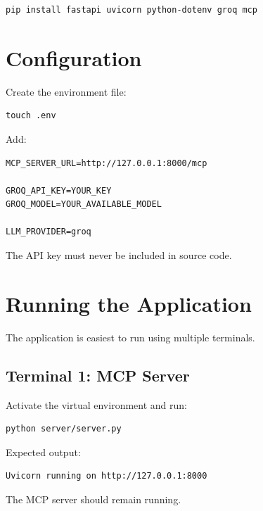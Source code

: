 \documentclass[11pt,a4paper]{article}
\begin{document}
\begin{lstlisting}[style=terminal]
pip install fastapi uvicorn python-dotenv groq mcp
\end{lstlisting}

\section{Configuration}

Create the environment file:

\begin{lstlisting}[style=terminal]
touch .env
\end{lstlisting}

Add:

\begin{lstlisting}[style=env]
MCP_SERVER_URL=http://127.0.0.1:8000/mcp

GROQ_API_KEY=YOUR_KEY
GROQ_MODEL=YOUR_AVAILABLE_MODEL

LLM_PROVIDER=groq
\end{lstlisting}

The API key must never be included in source code.

\section{Running the Application}

The application is easiest to run using multiple terminals.

\subsection{Terminal 1: MCP Server}

Activate the virtual environment and run:

\begin{lstlisting}[style=terminal]
python server/server.py
\end{lstlisting}

Expected output:

\begin{lstlisting}[style=terminal]
Uvicorn running on http://127.0.0.1:8000
\end{lstlisting}

The MCP server should remain running.
\end{document}

